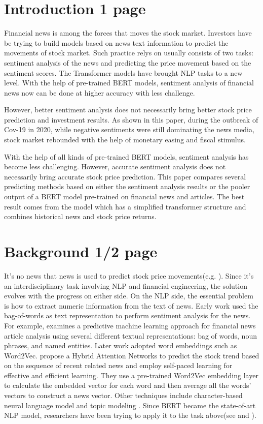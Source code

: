 \documentclass[11pt]{article}
\begin{document}
\section{Introduction 1 page}

Financial news is among the forces that moves the stock market. Investors have be trying to build models based on news text information to predict the movements of stock market. Such practice relys on usually consists of two tasks: sentiment analysis of the news and predicting the price movement based on the sentiment scores. The Transformer models have brought NLP tasks to a new level. With the help of pre-trained BERT models, sentiment analysis of financial news now can be done at higher accuracy with less challenge.

However, better sentiment analysis does not necessarily bring better stock price prediction and investment results. As shown in this paper, during the outbreak of Cov-19 in 2020, while negative sentiments were still dominating the news media, stock market rebounded with the help of monetary easing and fiscal stimulus.  

With the help of all kinds of pre-trained BERT models, sentiment analysis has become less challenging. However, accurate sentiment analysis does not necessarily bring accurate stock price prediction. This paper compares several predicting methods based on either the sentiment analysis results or the pooler output of a BERT model pre-trained on financial news and articles. The best result comes from the model which has a simplified transformer structure and combines historical news and stock price returns. 

\section{Background 1/2 page}

It's no news that news is used to predict stock price movements(e.g. \citealp{Tetlock:2007}). Since it's an interdisciplinary task involving NLP and financial engineering, the solution evolves with the progress on either side. On the NLP side, the essential problem is how to extract numeric information from the text of news. Early work used the bag-of-words as text representation to perform sentiment analysis for the news. For example, \citet{Schumaker:2009} examines a predictive machine learning approach for financial news article analysis using several different textual representations: bag of words, noun phrases, and named entities. Later work adopted word embeddings such as Word2Vec.\citet{Hu:2018} propose a Hybrid Attention Networks to predict the stock trend based on the sequence of recent related news and employ self-paced learning for effective and efficient learning. They use a pre-trained Word2Vec embedding layer to calculate the embedded vector for each word and then average all the words' vectors to construct a news vector. Other techniques include character-based neural language model \citep{dos-santos-pinheiro-dras-2017-stock} and topic modeling \citep{nguyen-shirai-2015-topic}. Since BERT became the state-of-art NLP model, researchers have been trying to apply it to the task above(see \citet{sawhney-etal-2021-quantitative} and \citet{tsutsumi-utsuro-2022-detecting}). 
\end{document}
